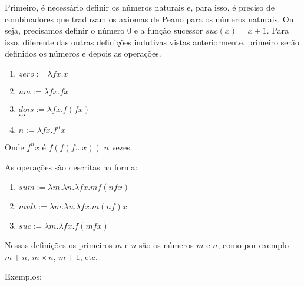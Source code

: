 \documentclass[../main.tex]{subfiles}
\begin{document}
Primeiro, é necessário definir os números naturais e, para isso, é preciso de combinadores que traduzam os axiomas de Peano para os números naturais. Ou seja, precisamos definir o número $0$ e a função sucessor $suc (x) = x + 1$. Para isso, diferente das outras definições indutivas vistas anteriormente, primeiro serão definidos os números e depois as operações.

\begin{definition}
    \hfill
    \begin{enumerate}
        \item $zero := \lambda fx .x$
        \item $um := \lambda fx . fx $
        \item $dois := \lambda fx . f(fx)$
        \\$\dots$
        \item $n := \lambda fx . f^n x$
    \end{enumerate}
\end{definition}

Onde $f^n x$ é $f(f(f \dots x))$ $n$ vezes.

As operações são descritas na forma:

\begin{definition}
    \hfill
    \begin{enumerate}
        \item $sum := \lambda m . \lambda n . \lambda fx . m f(nfx)$
        \item $mult := \lambda m . \lambda n . \lambda fx . m (nf) x$
        \item $suc := \lambda m . \lambda fx . f (m f x)$
    \end{enumerate}
\end{definition}

Nessas definições os primeiros $m$ e $n$ são os números $m$ e $n$, como por exemplo $m + n$, $m \times n$, $m + 1$, etc.

Exemplos:
\end{document}
